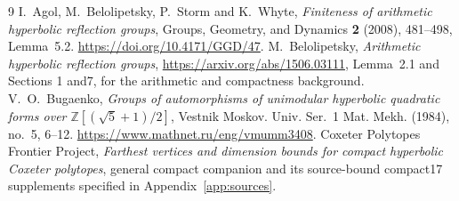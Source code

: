 \documentclass[11pt]{article}
\begin{document}
\begin{thebibliography}{9}
I.~Agol, M.~Belolipetsky, P.~Storm and K.~Whyte,
\emph{Finiteness of arithmetic hyperbolic reflection groups},
Groups, Geometry, and Dynamics \textbf{2} (2008), 481--498,
Lemma~5.2.
\url{https://doi.org/10.4171/GGD/47}.
M.~Belolipetsky, \emph{Arithmetic hyperbolic reflection groups},
\url{https://arxiv.org/abs/1506.03111}, Lemma~2.1 and
Sections 1 and7, for the arithmetic and compactness background.
V.~O.~Bugaenko, \emph{Groups of automorphisms of unimodular hyperbolic
quadratic forms over $\mathbb Z[(\sqrt5+1)/2]$}, Vestnik Moskov.
Univ. Ser.~1 Mat. Mekh. (1984), no.~5, 6--12.
\url{https://www.mathnet.ru/eng/vmumm3408}.
Coxeter Polytopes Frontier Project,
\emph{Farthest vertices and dimension bounds for compact hyperbolic
Coxeter polytopes}, general compact companion and its source-bound
compact17 supplements specified in Appendix~\ref{app:sources}.
\end{thebibliography}
\end{document}

